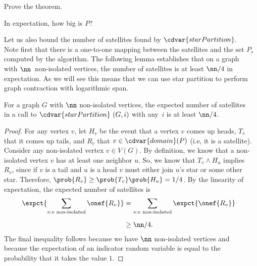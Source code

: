 \begin{exercise}
Prove the theorem.
\end{exercise}

\begin{teachask}
In expectation, how big is $P$?
\end{teachask}

\begin{gram}
\label{graphcon::star::partition::analysis::nsat}

Let us also bound the number of satellites found by
$\cdvar{starPartition}.$
%
Note first that there is a one-to-one mapping between the satellites
and the set $P_s$ computed by  the algorithm.
%
%
The following lemma establishes that on a graph with
$\nn$~non-isolated vertices, the number of satellites is at least
$\nn/4$ in expectation.
%
As we will see this means that we can use star partition to perform
graph contraction with logarithmic span.
\end{gram}

\begin{flex}

\begin{lemma}
\label{lem:graphcon::star::partition::analysis::satellites}
  For a graph $G$ with $\nn$ non-isolated vertices, the expected
  number of satellites in a call to $\cdvar{starPartition}~(G,i)$ with
  any~$i$ is at least $\nn/4$.
\end{lemma}

\begin{proof}
For any vertex $v$, let $H_v$ be the event that a vertex $v$ comes
  up heads, $T_v$ that it comes up tails, and $R_v$ that $v \in
  \cdvar{domain}(P)$ (i.e, it is a satellite).
%
  Consider any non-isolated vertex $v \in V(G)$.  By definition, we
  know that a non-isolated vertex $v$ has at least one neighbor $u$.
  So, we know that $T_v \land H_u$ implies $R_v$, since if $v$ is a
  tail and $u$ is a head $v$ must either join $u$'s star or some other
  star.  Therefore, $\prob{R_v} \geq \prob{T_v} \prob{H_u} = 1/4$.  By
  the linearity of expectation,  the expected number of satellites is
  \begin{align*}
    \expct{\sum_{v: v \text{ non-isolated}} \onef{R_v}} & = \sum_{v: v
      \text{ non-isolated}} \expct{\onef{R_v}} 
\\[2mm]
  & \geq \nn/4.
  \end{align*}
  The final inequality follows because we have $\nn$ non-isolated
  vertices and because the expectation of an indicator random variable
  is equal to the probability that it takes the value $1$.
\end{proof}
\end{flex}

